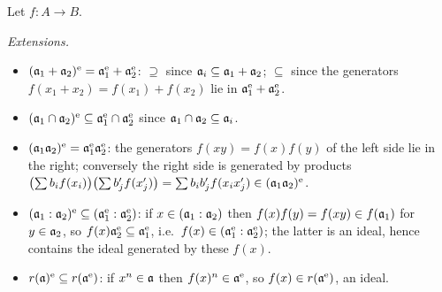 \documentclass[11pt]{article}
\begin{document}
\pf
Let $f:A\to B$.

\emph{Extensions.}
\begin{itemize}[leftmargin=*]
\item $(\mathfrak a_1+\mathfrak a_2)^{\mathrm{e}}=\mathfrak a_1^{\mathrm{e}}+\mathfrak a_2^{\mathrm{e}}$: $\supseteq$ since $\mathfrak a_i\subseteq\mathfrak a_1+\mathfrak a_2$; $\subseteq$ since the generators $f(x_1+x_2)=f(x_1)+f(x_2)$ lie in $\mathfrak a_1^{\mathrm{e}}+\mathfrak a_2^{\mathrm{e}}$.
\item $(\mathfrak a_1\cap\mathfrak a_2)^{\mathrm{e}}\subseteq\mathfrak a_1^{\mathrm{e}}\cap\mathfrak a_2^{\mathrm{e}}$ since $\mathfrak a_1\cap\mathfrak a_2\subseteq\mathfrak a_i$.
\item $(\mathfrak a_1\mathfrak a_2)^{\mathrm{e}}=\mathfrak a_1^{\mathrm{e}}\mathfrak a_2^{\mathrm{e}}$: the generators $f(xy)=f(x)f(y)$ of the left side lie in the right; conversely the right side is generated by products $\bigl(\sum b_if(x_i)\bigr)\bigl(\sum b'_jf(x'_j)\bigr)=\sum b_ib'_jf(x_ix'_j)\in(\mathfrak a_1\mathfrak a_2)^{\mathrm{e}}$.
\item $(\mathfrak a_1:\mathfrak a_2)^{\mathrm{e}}\subseteq(\mathfrak a_1^{\mathrm{e}}:\mathfrak a_2^{\mathrm{e}})$: if $x\in(\mathfrak a_1:\mathfrak a_2)$ then $f(x)f(y)=f(xy)\in f(\mathfrak a_1)$ for $y\in\mathfrak a_2$, so $f(x)\mathfrak a_2^{\mathrm{e}}\subseteq\mathfrak a_1^{\mathrm{e}}$, i.e.\ $f(x)\in(\mathfrak a_1^{\mathrm{e}}:\mathfrak a_2^{\mathrm{e}})$; the latter is an ideal, hence contains the ideal generated by these $f(x)$.
\item $r(\mathfrak a)^{\mathrm{e}}\subseteq r(\mathfrak a^{\mathrm{e}})$: if $x^n\in\mathfrak a$ then $f(x)^n\in\mathfrak a^{\mathrm{e}}$, so $f(x)\in r(\mathfrak a^{\mathrm{e}})$, an ideal.
\end{itemize}
\end{document}
